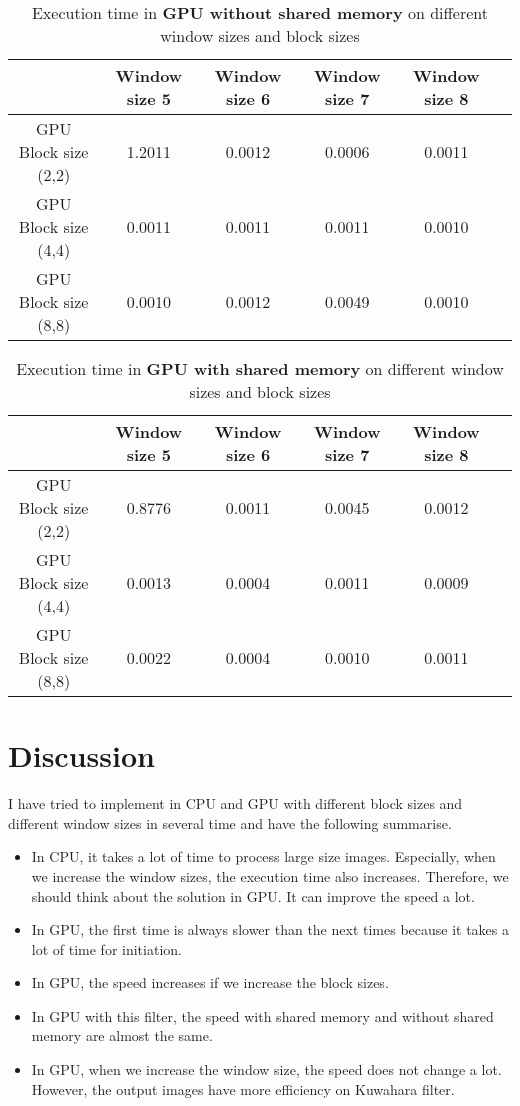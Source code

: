 \documentclass[12pt]{article}
\begin{document}
\begin{table}[H]
    \centering
    \begin{tabular}{|c|c|c|c|c|c|}
        \hline
         & Window size 5 & Window size 6 & Window size 7 & Window size 8 \\ 
        \hline
        GPU Block size (2,2) & 1.2011 & 0.0012 & 0.0006 & 0.0011\\ 
        \hline
        GPU Block size (4,4) & 0.0011 & 0.0011 & 0.0011 & 0.0010\\ 
        \hline
        GPU Block size (8,8) & 0.0010 & 0.0012 & 0.0049 & 0.0010\\ 
        \hline
    \end{tabular}
    \caption{Execution time in \textbf{GPU without shared memory} on different window sizes and block sizes}
    \label{tab:mytable}
\end{table}

\begin{table}[H]
    \centering
    \begin{tabular}{|c|c|c|c|c|c|}
        \hline
         & Window size 5 & Window size 6 & Window size 7 & Window size 8 \\ 
        \hline
        GPU Block size (2,2) & 0.8776 & 0.0011 & 0.0045 & 0.0012\\ 
        \hline
        GPU Block size (4,4) & 0.0013 & 0.0004 & 0.0011 & 0.0009\\ 
        \hline
        GPU Block size (8,8) & 0.0022 & 0.0004 & 0.0010 & 0.0011\\ 
        \hline
    \end{tabular}
    \caption{Execution time in \textbf{GPU with shared memory} on different window sizes and block sizes}
    \label{tab:mytable}
\end{table}

\section{Discussion}
I have tried to implement in CPU and GPU with different block sizes and different window sizes in several time and have the following summarise.
\begin{itemize}
    \item In CPU, it takes a lot of time to process large size images. Especially, when we increase the window sizes, the execution time also increases. Therefore, we should think about the solution in GPU. It can improve the speed a lot.
    \item In GPU, the first time is always slower than the next times because it takes a lot of time for initiation.
    \item In GPU, the speed increases if we increase the block sizes.
    \item In GPU with this filter, the speed with shared memory and without shared memory are almost the same.
    \item In GPU, when we increase the window size, the speed does not change a lot. However, the output images have more efficiency on Kuwahara filter.
\end{itemize}
\end{document}
